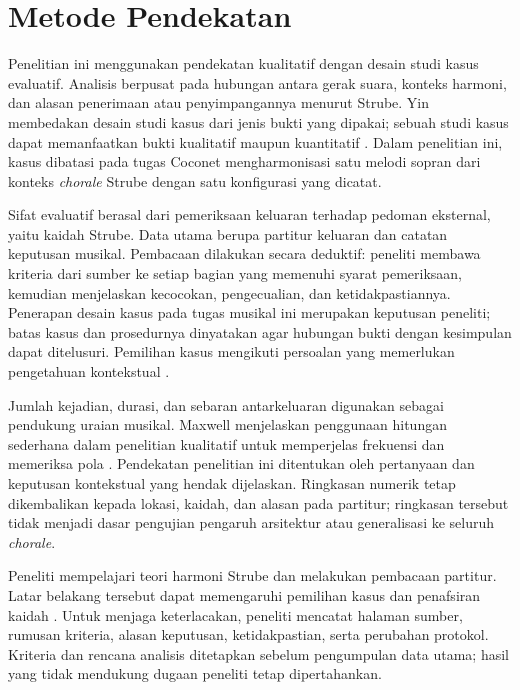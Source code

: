 
\section{Metode Pendekatan}\label{sec:metode-pendekatan}

Penelitian ini menggunakan pendekatan kualitatif dengan desain studi kasus evaluatif. Analisis berpusat pada hubungan antara gerak suara, konteks harmoni, dan alasan penerimaan atau penyimpangannya menurut Strube. Yin membedakan desain studi kasus dari jenis bukti yang dipakai; sebuah studi kasus dapat memanfaatkan bukti kualitatif maupun kuantitatif \parencite[15--18]{yin2018}. Dalam penelitian ini, kasus dibatasi pada tugas Coconet mengharmonisasi satu melodi sopran dari konteks \textit{chorale} Strube dengan satu konfigurasi yang dicatat.

Sifat evaluatif berasal dari pemeriksaan keluaran terhadap pedoman eksternal, yaitu kaidah Strube. Data utama berupa partitur keluaran dan catatan keputusan musikal. Pembacaan dilakukan secara deduktif: peneliti membawa kriteria dari sumber ke setiap bagian yang memenuhi syarat pemeriksaan, kemudian menjelaskan kecocokan, pengecualian, dan ketidakpastiannya. Penerapan desain kasus pada tugas musikal ini merupakan keputusan peneliti; batas kasus dan prosedurnya dinyatakan agar hubungan bukti dengan kesimpulan dapat ditelusuri. Pemilihan kasus mengikuti persoalan yang memerlukan pengetahuan kontekstual \parencite{flyvbjerg2006}.

Jumlah kejadian, durasi, dan sebaran antarkeluaran digunakan sebagai pendukung uraian musikal. Maxwell menjelaskan penggunaan hitungan sederhana dalam penelitian kualitatif untuk memperjelas frekuensi dan memeriksa pola \parencite[476--478]{maxwell2010}. Pendekatan penelitian ini ditentukan oleh pertanyaan dan keputusan kontekstual yang hendak dijelaskan. Ringkasan numerik tetap dikembalikan kepada lokasi, kaidah, dan alasan pada partitur; ringkasan tersebut tidak menjadi dasar pengujian pengaruh arsitektur atau generalisasi ke seluruh \textit{chorale}.

Peneliti mempelajari teori harmoni Strube dan melakukan pembacaan partitur. Latar belakang tersebut dapat memengaruhi pemilihan kasus dan penafsiran kaidah \parencite{holmes2020, jamieson2023}. Untuk menjaga keterlacakan, peneliti mencatat halaman sumber, rumusan kriteria, alasan keputusan, ketidakpastian, serta perubahan protokol. Kriteria dan rencana analisis ditetapkan sebelum pengumpulan data utama; hasil yang tidak mendukung dugaan peneliti tetap dipertahankan.

